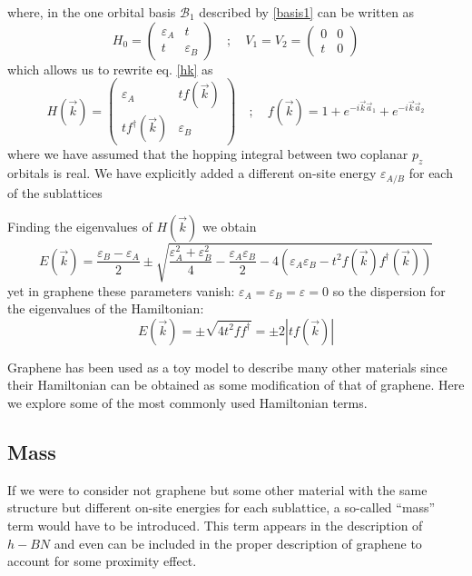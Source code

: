 where, in the one orbital basis $\mathcal{B}_1$ described by \eqref{basis1} can be written as
\begin{equation}
   H_0 = \left(\begin{array}{cc}
               \varepsilon_A & t \\
               t & \varepsilon_B
         \end{array}\right) \quad;\quad
   V_1 = V_2 = \left(\begin{array}{cc}
                     0 & 0 \\
                     t & 0
               \end{array}\right)
\end{equation}
which allows us to rewrite eq. \eqref{hk} as
\begin{equation}
  H(\vec{k})=\left(\begin{array}{cc}
        \varepsilon_{A} & tf(\vec{k}) \\
  tf^{\dagger}(\vec{k}) & \varepsilon_{B}
  \end{array}\right) \quad;\quad
  f(\vec{k}) = 1 + e^{-i\vec{k}\vec{a}_{1}}+
e^{-i\vec{k}\vec{a}_{2}}
\end{equation}
where we have assumed that the hopping integral between two coplanar $p_z$ orbitals is real. We have explicitly added a different on-site energy $\varepsilon_{A/B}$ for each of the sublattices

Finding the eigenvalues of $H(\vec{k})$ we obtain
\begin{equation}
  E(\vec{k})=\frac{\varepsilon_{B}-\varepsilon_{A}}{2}\pm
  \sqrt{\frac{\varepsilon^{2}_{A}+\varepsilon^{2}_{B}}{4}-
  \frac{\varepsilon_{A}\varepsilon_{B}}{2}-
  4\left(\varepsilon_{A}\varepsilon_{B}-
                                   t^2f(\vec{k})f^{\dagger}(\vec{k})\right) }
\end{equation}
yet in graphene these parameters vanish: $\varepsilon_{A}=\varepsilon_{B}=\varepsilon=0$ so the dispersion for the eigenvalues of the Hamiltonian:
\begin{equation}
  E(\vec{k})=\pm\sqrt{4t^2ff^{\dagger}} = \pm2|tf(\vec{k})|
\end{equation}

%
%

\medbreak
Graphene has been used as a toy model to describe many other materials since their Hamiltonian can be obtained as some modification of that of graphene. Here we explore some of the most commonly used Hamiltonian terms.

\subsection{Mass}
If we were to consider not graphene but some other material with the same structure but different on-site energies for each sublattice, a so-called ``mass'' term would have to be introduced. This term appears in the description of $h-BN$ and even can be included in the proper description of graphene to account for some proximity effect.


